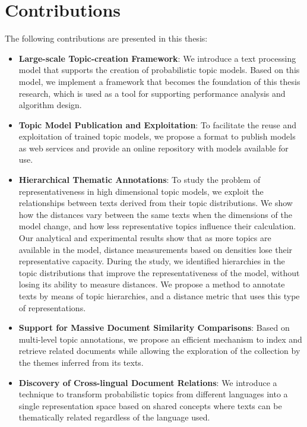 \section{Contributions}

The following contributions are presented in this thesis:

\begin{itemize}
\item \textbf{Large-scale Topic-creation Framework}: We introduce a text processing model that supports the creation of probabilistic topic models. Based on this model, we implement a framework that becomes the foundation of this thesis research, which is used as a tool for supporting performance analysis and algorithm design.
\item \textbf{Topic Model Publication and Exploitation}: To facilitate the reuse and exploitation of trained topic models, we propose a format to publish models as web services and provide an online repository with models available for use.
\item \textbf{Hierarchical Thematic Annotations}: To study the problem of representativeness in high dimensional topic models, we exploit the relationships between texts derived from their topic distributions. We show how the distances vary between the same texts when the dimensions of the model change, and how less representative topics influence their calculation. Our analytical and experimental results show that as more topics are available in the model, distance measurements based on densities lose their representative capacity. During the study, we identified hierarchies in the topic distributions that improve the representativeness of the model, without losing its ability to measure distances. We propose a method to annotate texts by means of topic hierarchies, and a distance metric that uses this type of representations.
\item \textbf{Support for Massive Document Similarity Comparisons}: Based on multi-level topic annotations, we propose an efficient mechanism to index and retrieve related documents while allowing the exploration of the collection by the themes inferred from its texts.
\item \textbf{Discovery of Cross-lingual Document Relations}: We introduce a technique to transform probabilistic topics from different languages into a single representation space based on shared concepts where texts can be thematically related regardless of the language used.
\end{itemize}

